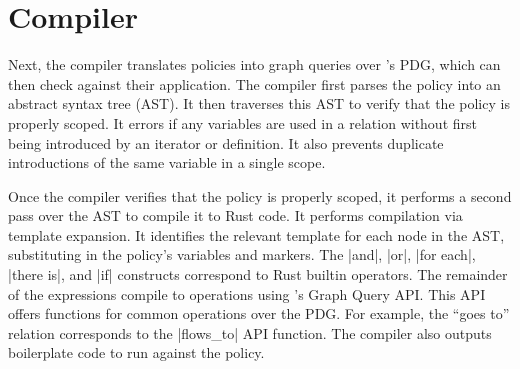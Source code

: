 \section{Compiler}

Next, the \syslang{} compiler translates policies into graph queries over \sys{}'s PDG,
which \devs{} can then check against their application.
%
The compiler first parses the policy into an abstract syntax tree (AST).
%
It then traverses this AST to verify that the policy is properly scoped.
%
It errors if any variables are used in a relation without first being introduced by an iterator or definition.
%
It also prevents duplicate introductions of the same variable in a single scope.

Once the compiler verifies that the policy is properly scoped,
it performs a second pass over the AST to compile it to Rust code.
%
It performs compilation via template expansion.
%
It identifies the relevant template for each node in the AST,
substituting in the policy's variables and markers.
%
The |and|, |or|, |for each|, |there is|, and |if| constructs correspond to Rust builtin operators.
%
The remainder of the expressions compile to operations using \sys{}'s Graph Query API.
%
This API offers functions for common operations over the PDG.
%
For example, the ``goes to'' relation corresponds to the |flows_to| \sys{} API function.
%
The compiler also outputs boilerplate code to run \sys{} against the policy.

